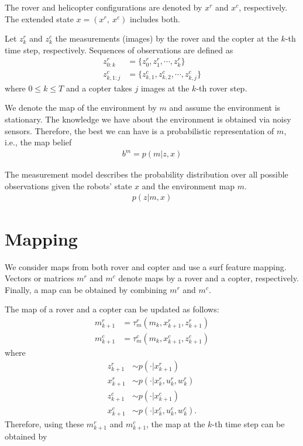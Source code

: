 \documentclass[conference]{IEEEtran}
\begin{document}
The rover and helicopter configurations are denoted by $x^r$ and $x^c$, respectively. The extended state $x=(x^r,~x^c)$ includes both.

Let $z^r_k$ and $z^c_k$ the measurements (images) by the rover and the copter at the $k$-th time step, respectively. Sequences of observations are defined as
\begin{align}
    z^r_{0:k}&=\{z^r_0,z^r_1,\cdots,z^r_k\}\\
    z^c_{k,1:j}&=\{z^c_{k,1},z^c_{k,2},\cdots,z^c_{k,j}\}
\end{align}
where $0 \leq k \leq T$ and a copter takes $j$ images at the $k$-th rover step.

We denote the map of the environment by $m$ and assume the environment is stationary. The knowledge we have about the environment is obtained via noisy sensors. Therefore, the best we can have is a probabilistic representation of $m$, i.e., the map belief
\begin{align}
    b^m=p(m|z, x)
\end{align}

The measurement model describes the probability distribution over all possible observations given the robots' state $x$ and the environment map $m$.
\begin{align}
    p(z|m, x)
\end{align}


\section{Mapping}

We consider maps from both rover and copter and use a surf feature mapping. Vectors or matrices $m^r$ and $m^c$ denote maps by a rover and a copter, respectively. Finally, a map can be obtained by combining $m^r$ and $m^c$.

The map of a rover and a copter can be updated as follows:
\begin{align}
    m^r_{k+1}&=\tau^r_m (m_k, x^r_{k+1}, z^r_{k+1})\\
    m^c_{k+1}&=\tau^c_m (m_k, x^c_{k+1}, z^c_{k+1})
\end{align}
where
\begin{align}
    z^r_{k+1} &\sim p(\cdot |x^r_{k+1})\\
    x^r_{k+1} &\sim p(\cdot |x^r_k, u^r_k, w^r_k)\\
    z^c_{k+1} &\sim p(\cdot |x^c_{k+1})\\
    x^c_{k+1} &\sim p(\cdot |x^c_k, u^c_k, w^c_k).
\end{align}
Therefore, using these $m^r_{k+1}$ and $m^c_{k+1}$, the map at the $k$-th time step can be obtained by
\end{document}
